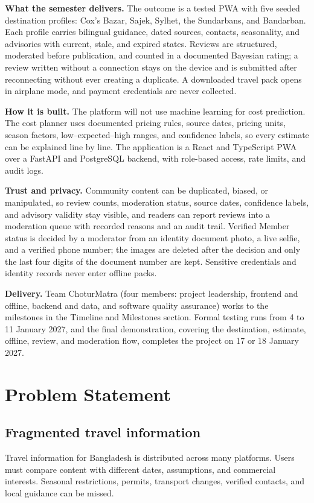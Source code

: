 \documentclass[11pt,a4paper]{article}
\begin{document}
\textbf{What the semester delivers.} The outcome is a tested PWA with five seeded destination profiles: Cox's Bazar, Sajek, Sylhet, the Sundarbans, and Bandarban. Each profile carries bilingual guidance, dated sources, contacts, seasonality, and advisories with current, stale, and expired states. Reviews are structured, moderated before publication, and counted in a documented Bayesian rating; a review written without a connection stays on the device and is submitted after reconnecting without ever creating a duplicate. A downloaded travel pack opens in airplane mode, and payment credentials are never collected.

\textbf{How it is built.} The platform will not use machine learning for cost prediction. The cost planner uses documented pricing rules, source dates, pricing units, season factors, low--expected--high ranges, and confidence labels, so every estimate can be explained line by line. The application is a React and TypeScript PWA over a FastAPI and PostgreSQL backend, with role-based access, rate limits, and audit logs.

\textbf{Trust and privacy.} Community content can be duplicated, biased, or manipulated, so review counts, moderation status, source dates, confidence labels, and advisory validity stay visible, and readers can report reviews into a moderation queue with recorded reasons and an audit trail. Verified Member status is decided by a moderator from an identity document photo, a live selfie, and a verified phone number; the images are deleted after the decision and only the last four digits of the document number are kept. Sensitive credentials and identity records never enter offline packs.

\textbf{Delivery.} Team ChoturMatra (four members: project leadership, frontend and offline, backend and data, and software quality assurance) works to the milestones in the Timeline and Milestones section. Formal testing runs from 4 to 11 January 2027, and the final demonstration, covering the destination, estimate, offline, review, and moderation flow, completes the project on 17 or 18 January 2027.
\clearpage

\section{Problem Statement}
\subsection{Fragmented travel information}
Travel information for Bangladesh is distributed across many platforms. Users must compare content with different dates, assumptions, and commercial interests. Seasonal restrictions, permits, transport changes, verified contacts, and local guidance can be missed.
\end{document}
